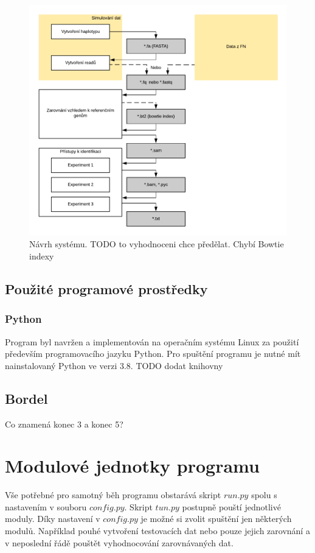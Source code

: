 \documentclass[czech,DP]{thesiskiv}
\numberwithin{equation}{section}
\begin{document}
\begin{figure}[H]
		\centering
		\includegraphics[width=\textwidth]{./img/navrh_systemu.pdf}
		\caption{Návrh systému. TODO to vyhodnoceni chce předělat. Chybí Bowtie indexy }
		\label{fig:navrh_systemu}
\end{figure}

\subsection{Použité programové prostředky}
\subsubsection{Python}
Program byl navržen a implementován na operačním systému Linux za použití především programovacího jazyku Python. 
 Pro spuštění programu je nutné mít nainstalovaný Python ve verzi 3.8.
 TODO dodat knihovny 


\subsection{Bordel}
Co znamená konec 3 a konec 5? 




\section{Modulové jednotky programu}
Vše potřebné pro samotný běh programu obstarává skript $run.py$ spolu s nastavením v souboru $config.py$. Skript $tun.py$ postupně pouští jednotlivé moduly. Díky nastavení v $config.py$ je možné si zvolit spuštění jen některých modulů. Například pouhé vytvoření testovacích dat nebo pouze jejich zarovnání a v neposlední řádě pouštět vyhodnocování zarovnávaných dat.
\end{document}
